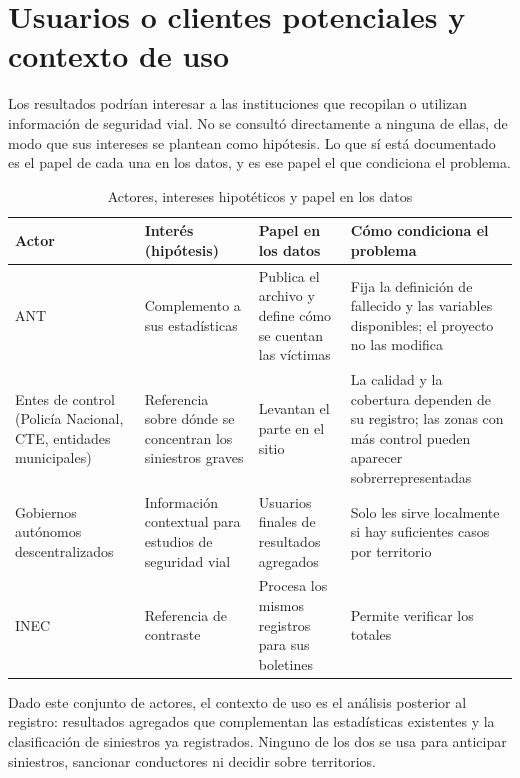 \section{Usuarios o clientes potenciales y contexto de uso}

Los resultados podrían interesar a las instituciones que recopilan o utilizan información de seguridad vial. No se consultó directamente a ninguna de ellas, de modo que sus intereses se plantean como hipótesis. Lo que sí está documentado es el papel de cada una en los datos, y es ese papel el que condiciona el problema.

\begin{table}[htbp]
\centering
\small
\caption{Actores, intereses hipotéticos y papel en los datos}
\label{tab:actores}
\begin{tabularx}{\textwidth}{p{2.5cm}p{3.6cm}p{3.7cm}X}
\toprule
Actor & Interés (hipótesis) & Papel en los datos & Cómo condiciona el problema \\
\midrule
ANT & Complemento a sus estadísticas & Publica el archivo y define cómo se cuentan las víctimas & Fija la definición de fallecido y las variables disponibles; el proyecto no las modifica \\
Entes de control (Policía Nacional, CTE, entidades municipales) & Referencia sobre dónde se concentran los siniestros graves & Levantan el parte en el sitio & La calidad y la cobertura dependen de su registro; las zonas con más control pueden aparecer sobrerrepresentadas \\
Gobiernos autónomos descentralizados & Información contextual para estudios de seguridad vial & Usuarios finales de resultados agregados & Solo les sirve localmente si hay suficientes casos por territorio \\
INEC & Referencia de contraste & Procesa los mismos registros para sus boletines \cite{ref1} & Permite verificar los totales \\
\bottomrule
\end{tabularx}
\end{table}

Dado este conjunto de actores, el contexto de uso es el análisis posterior al registro: resultados agregados que complementan las estadísticas existentes y la clasificación de siniestros ya registrados. Ninguno de los dos se usa para anticipar siniestros, sancionar conductores ni decidir sobre territorios.
